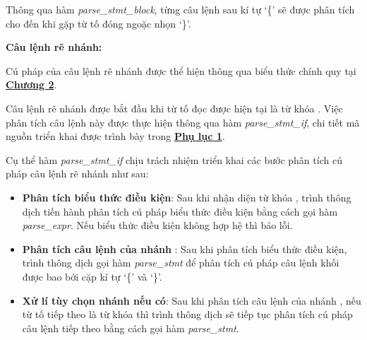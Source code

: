 Thông qua hàm \textit{parse\_stmt\_block}, từng câu lệnh sau kí tự `\{' sẽ được phân tích cho đến khi gặp từ tố đóng ngoặc nhọn `\}'.



\textbf{Câu lệnh rẽ nhánh:} 

Cú pháp của câu lệnh rẽ nhánh được thể hiện thông qua biểu thức chính quy tại \hyperref[ch2:if_stmt]{\bf Chương 2}.

Câu lệnh rẽ nhánh được bắt đầu khi từ tố đọc được hiện tại là từ khóa . Việc phân tích câu lệnh này được thực hiện thông qua hàm \textit{parse\_stmt\_if}, chi tiết mã nguồn triển khai được trình bày trong \hyperref[ap1:stmt_when]{\bf Phụ lục 1}. %
        
        
Cụ thể hàm \textit{parse\_stmt\_if} chịu trách nhiệm triển khai các bước phân tích cú pháp câu lệnh rẽ nhánh như sau:
\begin{itemize}
    \item \textbf{Phân tích biểu thức điều kiện}: 
    Sau khi nhận diện từ khóa , trình thông dịch tiến hành phân tích cú pháp biểu thức điều kiện bằng cách gọi hàm \textit{parse\_expr}. Nếu biểu thức điều kiện không hợp hệ thì báo lỗi.
    \item \textbf{Phân tích câu lệnh của nhánh }: 
    Sau khi phân tích biểu thức điều kiện, trình thông dịch gọi hàm \textit{parse\_stmt} để phân tích cú pháp câu lệnh khối được bao bởi cặp kí tự `\{' và `\}'.
    \item \textbf{Xử lí tùy chọn nhánh  nếu có}:
    Sau khi phân tích câu lệnh của nhánh , nếu từ tố tiếp theo là từ khóa  thì trình thông dịch sẽ tiếp tục phân tích cú pháp câu lệnh tiếp theo bằng cách gọi hàm \textit{parse\_stmt}.

\end{itemize}

